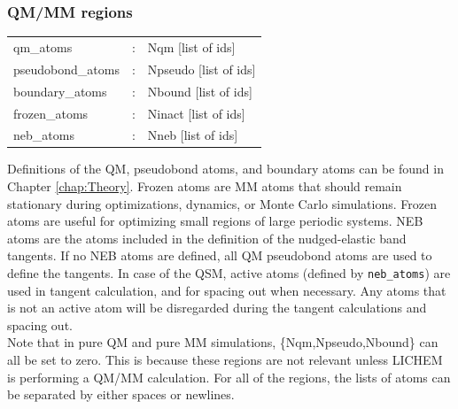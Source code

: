 \documentclass[12pt]{report}
\begin{document}
\subsubsection{QM/MM regions}
\begin{center}
\begin{longtable}{ p{4cm} c p{12.5cm}}
qm\_atoms & : & Nqm [list of ids] \newline\\

pseudobond\_atoms & : & Npseudo [list of ids] \newline\\

boundary\_atoms & : & Nbound [list of ids] \newline\\

frozen\_atoms& : & Ninact [list of ids] \newline \\

neb\_atoms & : & Nneb [list of ids] 
\end{longtable}
\end{center}
\vspace{-12pt}
Definitions of the QM, pseudobond atoms, and boundary atoms can be found in
Chapter \ref{chap:Theory}.
Frozen atoms are MM atoms that should remain stationary during optimizations,
dynamics, or Monte Carlo simulations.
Frozen atoms are useful for optimizing small regions of large periodic
systems.
NEB atoms are the atoms included in the definition of the nudged-elastic band
tangents.
If no NEB atoms are defined, all QM pseudobond atoms are used to define the
tangents. 
In case of the QSM, active atoms (defined by \texttt{neb\_atoms})
 are used in tangent 
calculation, and for spacing out when necessary. 
Any atoms that is not an active atom will be disregarded during the 
tangent calculations and spacing out.\\

Note that in pure QM and pure MM simulations, \{Nqm,Npseudo,Nbound\} can all
be set to zero.
This is because these regions are not relevant unless LICHEM is performing a
QM/MM calculation.
For all of the regions, the lists of atoms can be separated by either spaces
or newlines.\newpage
\end{document}

